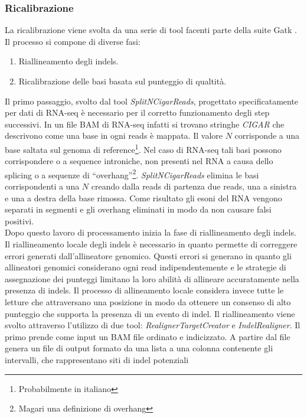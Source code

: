     \subsubsection{Ricalibrazione}
    La ricalibrazione viene svolta da una serie di tool facenti parte della suite Gatk \cite{gatk}.
    Il processo si compone di diverse fasi:
    \begin{multicols}{2}
      \begin{enumerate}
        \item Riallineamento degli indels.
        \item Ricalibrazione delle basi basata sul punteggio di qualtit\`a.
      \end{enumerate}
    \end{multicols}
    Il primo passaggio, svolto dal tool \emph{SplitNCigarReads}, progettato specificatamente per dati di RNA-seq \`e necessario per il corretto funzionamento degli step successivi.
    In un file BAM di RNA-seq infatti si trovano stringhe \emph{CIGAR} che descrivono come una base in ogni reads \`e mappata.
    Il valore $N$ corrisponde a una base saltata sul genoma di reference\footnote{Probabilmente in italiano}.
    Nel caso di RNA-seq tali basi possono corrispondere o a sequence introniche, non presenti nel RNA a causa dello splicing o a sequenze di ``overhang''\footnote{Magari una definizione di overhang}.
    \emph{SplitNCigarReads} elimina le basi corrispondenti a una $N$ creando dalla reads di partenza due reads, una a sinistra e una a destra della base rimossa.
    Come risultato gli esoni del RNA vengono separati in segmenti e gli overhang eliminati in modo da non causare falsi positivi.\\
    Dopo questo lavoro di processamento inizia la fase di riallineamento degli indels.
    Il riallineamento locale degli indels \`e necessario in quanto permette di correggere errori generati dall'allineatore genomico.
    Questi errori si generano in quanto gli allineatori genomici considerano ogni read indipendentemente e le strategie di assegnazione dei punteggi limitano la loro abilit\`a di allineare accuratamente nella presenza di indels.
    Il processo di allineamento locale considera invece tutte le letture che attraversano una posizione in modo da ottenere un consenso di alto punteggio che supporta la presenza di un evento di indel.
    Il riallineamento viene svolto attraverso l'utilizzo di due tool: \emph{RealignerTargetCreator} e \emph{IndelRealigner}.
    Il primo prende come input un BAM file ordinato e indicizzato.
    A partire dal file genera un file di output formato da una lista a una colonna contenente gli intervalli, che rappresentano siti di indel potenziali
